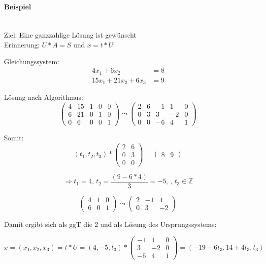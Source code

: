 \paragraph{Beispiel}~\\
Ziel: Eine ganzzahlige Lösung ist gewünscht~\\
Erinnerung: $U*A = S$ und $x = t*U$

Gleichungssystem:
\begin{align*}
  4x_1 +  6x_2         & = 8 \\
  15x_1 + 21x_2 + 6x_3 & = 9
\end{align*}

Lösung nach Algorithmus:
\[\left(
\begin{array}{cc|ccc}
  4 & 15 & 1 & 0 & 0    \\
  6 & 21 & 0 & 1 & 0    \\
  0 & 6  & 0 & 0 & 1%
\end{array}%
\right) \leadsto \left(
\begin{array}{cc|ccc}
  2 & 6 & -1 & 1  & 0    \\
  0 & 3 & 3  & -2 & 0    \\
  0 & 0 & -6 & 4  & 1%
\end{array}%
\right)\]

Somit:
\[\left(
t_1, t_2, t_3
\right) *
\left(
\begin{array}{cc}
  2 & 6    \\
  0 & 3    \\
  0 & 0%
\end{array}
\right)
=
\left(
\begin{array}{cc}
  8 & 9
\end{array}
\right)\]

\[\Rightarrow t_1 = 4 \text{, } t_2 = \frac{(9-6*4)}{3} = -5 \text{, } \text{, }t_3 \in \mathbb{Z}\]

\[\left(
\begin{array}{c|cc}
  4 & 1 & 0    \\
  6 & 0 & 1%
\end{array}
\right) \leadsto \left(
\begin{array}{c|cc}
  2 & -1 & 1     \\
  0 & 3  & -2%
\end{array}
\right)\]

Damit ergibt sich als ggT die 2 und als Lösung des Ursprungssystems:

\[x = (x_1, x_2, x_3) = t * U =
(4,-5,t_3) *
\left(
\begin{array}{ccc}
  -1 & 1  & 0 \\
  3  & -2 & 0 \\
  -6 & 4  & 1
\end{array}
\right)
= (-19-6t_3, 14+4t_3, t_3)\]


